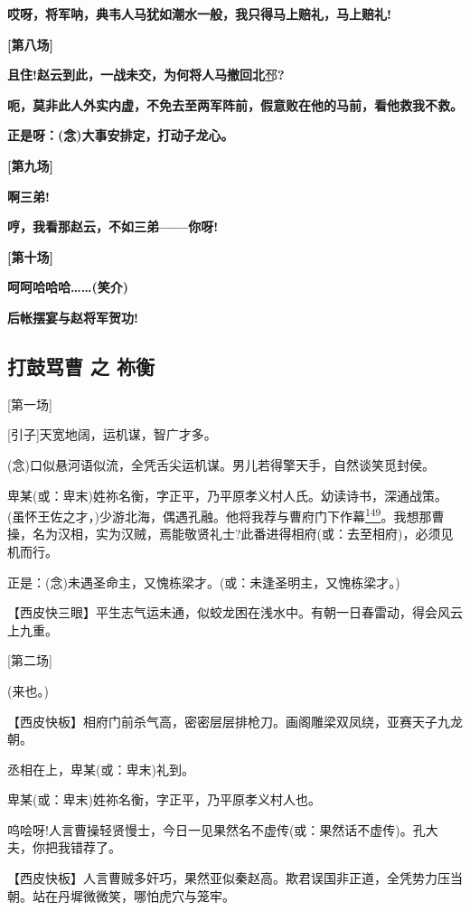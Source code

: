 \textbf{哎呀，将军呐，典韦人马犹如潮水一般，我只得马上赔礼，马上赔礼!}

\textbf{{[}第八场{]}}

\textbf{且住!赵云到此，一战未交，为何将人马撤回北}邳\textbf{?}

\textbf{呃，莫非此人外实内虚，不免去至两军阵前，假意败在他的马前，看他救我不救。}

\textbf{正是呀：(念)大事安排定，打动子龙心。}

\textbf{{[}第九场{]}}

\textbf{啊三弟!}

\textbf{哼，我看那赵云，不如三弟------你呀!}

\textbf{{[}第十场{]}}

\textbf{呵呵哈哈哈\ldots{}\ldots{}(笑介)}

\textbf{后帐摆宴与赵将军贺功!}

\newpage
\hypertarget{ux6253ux9f13ux9a82ux66f9-ux4e4b-ux7962ux8861}{%
\subsection{打鼓骂曹 之
祢衡}\label{ux6253ux9f13ux9a82ux66f9-ux4e4b-ux7962ux8861}}

{[}第一场{]}

{[}引子{]}天宽地阔，运机谋，智广才多。

(念)口似悬河语似流，全凭舌尖运机谋。男儿若得擎天手，自然谈笑觅封侯。

卑某(或：卑末)姓祢名衡，字正平，乃平原孝义村人氏。幼读诗书，深通战策。(虽怀王佐之才，)少游北海，偶遇孔融。他将我荐与曹府门下作幕\protect\hyperlink{fn149}{\textsuperscript{149}}。我想那曹操，名为汉相，实为汉贼，焉能敬贤礼士?此番进得相府(或：去至相府)，必须见机而行。

正是：(念)未遇圣命主，又愧栋梁才。(或：未逢圣明主，又愧栋梁才。)

【西皮快三眼】平生志气运未通，似蛟龙困在浅水中。有朝一日春雷动，得会风云上九重。

{[}第二场{]}

(来也。)

【西皮快板】相府门前杀气高，密密层层排枪刀。画阁雕梁双凤绕，亚赛天子九龙朝。

丞相在上，卑某(或：卑末)礼到。

卑某(或：卑末)姓祢名衡，字正平，乃平原孝义村人也。

呜哙呀!人言曹操轻贤慢士，今日一见果然名不虚传(或：果然话不虚传)。孔大夫，你把我错荐了。

【西皮快板】人言曹贼多奸巧，果然亚似秦赵高。欺君误国非正道，全凭势力压当朝。站在丹墀微微笑，哪怕虎穴与笼牢。

